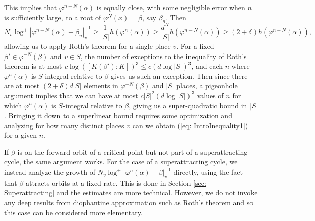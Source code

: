\documentclass[10pt, reqno]{amsart}
\newcommand{\vphi}{\varphi}
\numberwithin{theorem}{section}
\numberwithin{equation}{section}
\numberwithin{example}{section}
\numberwithin{definition}{section}
\begin{document}
This implies that $\vphi^{n-N}(\alpha)$ is equally close, with some negligible error when $n$ is sufficiently large, to a root of $\vphi^N(x) = \beta$, say $\beta_n$. Then
$$N_v \log^+|\vphi^{n-N}(\alpha) - \beta_n|_v^{-1} \geq \frac{1}{|S|} h(\vphi^n(\alpha)) \geq \frac{d^N}{|S|}  h(\vphi^{n-N}(\alpha)) \geq (2+\delta) h(\vphi^{n-N}(\alpha)),$$
allowing us to apply Roth's theorem for a single place $v$. For a fixed $\beta' \in \vphi^{-N}(\beta)$ and $v \in S$, the number of exceptions to the inequality of Roth's theorem is at most $c \log ( [K(\beta'):K])^3 \leq c (d \log |S|)^3$, and each $n$ where $\vphi^n(\alpha)$ is $S$-integral relative to $\beta$ gives us such an exception. Then since there are at most $(2+\delta)d|S|$ elements in $\vphi^{-N}(\beta)$ and $|S|$ places, a pigeonhole argument implies that we can have at most $c |S|^2 (d \log |S|)^3$ values of $n$ for which $\vphi^n(\alpha)$ is $S$-integral relative to $\beta$, giving us a super-quadratic bound in $|S|$. Bringing it down to a superlinear bound requires some optimization and analyzing for how many distinct places $v$ can we obtain (\ref{eq: IntroInequality1}) for a given $n$.  
\par 
If $\beta$ is on the forward orbit of a critical point but not part of a superattracting cycle, the same argument works. For the case of a superattracting cycle, we instead analyze the growth of $N_v \log^+|\vphi^n(\alpha)-\beta|_v^{-1}$ directly, using the fact that $\beta$ attracts orbits at a fixed rate. This is done in Section \ref{sec: Superattracting} and the estimates are more technical. However, we do not invoke any deep results from diophantine approximation such as Roth's theorem and so this case can be considered more elementary. 


\end{document}
